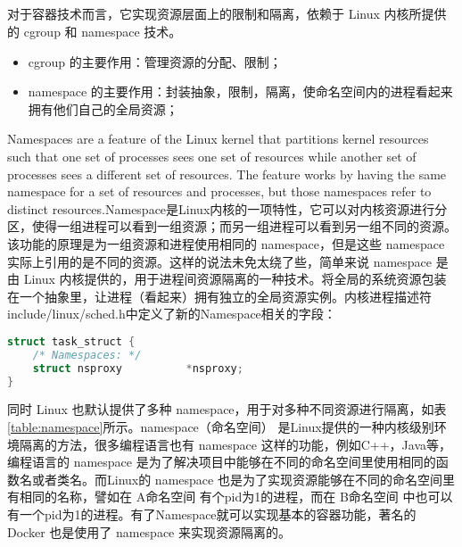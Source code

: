\documentclass[../../../interview-questions.tex]{subfiles}
\begin{document}
\subsection{\color{red}{容器三把斧之Namespace原理与实现}}

对于容器技术而言，它实现资源层面上的限制和隔离，依赖于 Linux 内核所提供的 cgroup 和 namespace 技术。

\begin{itemize}
    \item {cgroup 的主要作用：管理资源的分配、限制；}
    \item {namespace 的主要作用：封装抽象，限制，隔离，使命名空间内的进程看起来拥有他们自己的全局资源；}
\end{itemize}

Namespaces are a feature of the Linux kernel that partitions kernel resources such that one set of processes sees one set of resources while another set of processes sees a different set of resources. The feature works by having the same namespace for a set of resources and processes, but those namespaces refer to distinct resources.Namespace是Linux内核的一项特性，它可以对内核资源进行分区，使得一组进程可以看到一组资源；而另一组进程可以看到另一组不同的资源。该功能的原理是为一组资源和进程使用相同的 namespace，但是这些 namespace 实际上引用的是不同的资源。这样的说法未免太绕了些，简单来说 namespace 是由 Linux 内核提供的，用于进程间资源隔离的一种技术。将全局的系统资源包装在一个抽象里，让进程（看起来）拥有独立的全局资源实例。内核进程描述符include/linux/sched.h中定义了新的Namespace相关的字段：

\begin{lstlisting}[language=C]
struct task_struct {
	/* Namespaces: */
	struct nsproxy			*nsproxy;    
}
\end{lstlisting}

同时 Linux 也默认提供了多种 namespace，用于对多种不同资源进行隔离，如表\ref{table:namespace}所示。namespace（命名空间） 是Linux提供的一种内核级别环境隔离的方法，很多编程语言也有 namespace 这样的功能，例如C++，Java等，编程语言的 namespace 是为了解决项目中能够在不同的命名空间里使用相同的函数名或者类名。而Linux的 namespace 也是为了实现资源能够在不同的命名空间里有相同的名称，譬如在 A命名空间 有个pid为1的进程，而在 B命名空间 中也可以有一个pid为1的进程。有了Namespace就可以实现基本的容器功能，著名的 Docker 也是使用了 namespace 来实现资源隔离的。
\end{document}
